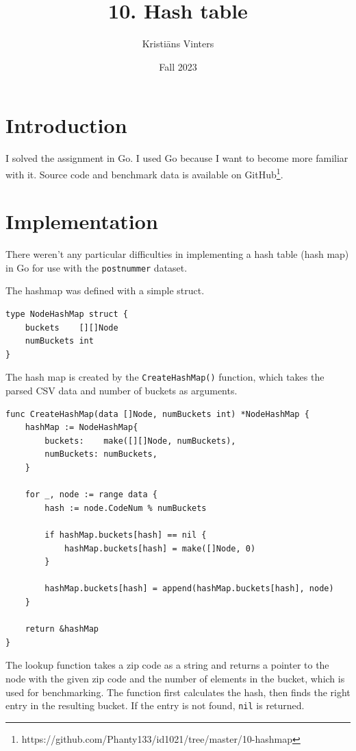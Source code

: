 \documentclass[a4paper,11pt]{article}
\title{\textbf{10. Hash table}}
\author{Kristiāns Vinters}
\date{Fall 2023}
\begin{document}
    \maketitle
    \section*{Introduction}

    I solved the assignment in Go. I used Go because I want to become more familiar with it. Source code and benchmark data is available on GitHub\footnote{https://github.com/Phanty133/id1021/tree/master/10-hashmap}.

    \section*{Implementation}

    There weren't any particular difficulties in implementing a hash table (hash map) in Go for use with the \texttt{postnummer} dataset.

    The hashmap was defined with a simple struct.

    \begin{verbatim}
type NodeHashMap struct {
    buckets    [][]Node
    numBuckets int
}
    \end{verbatim}

    The hash map is created by the \texttt{CreateHashMap()} function, which takes the parsed CSV data and number of buckets as arguments.

    \begin{verbatim}
func CreateHashMap(data []Node, numBuckets int) *NodeHashMap {
    hashMap := NodeHashMap{
        buckets:    make([][]Node, numBuckets),
        numBuckets: numBuckets,
    }

    for _, node := range data {
        hash := node.CodeNum % numBuckets

        if hashMap.buckets[hash] == nil {
            hashMap.buckets[hash] = make([]Node, 0)
        }

        hashMap.buckets[hash] = append(hashMap.buckets[hash], node)
    }

    return &hashMap
}
    \end{verbatim}

    The lookup function takes a zip code as a string and returns a pointer to the node with the given zip code and the number of elements in the bucket, which is used for benchmarking. The function first calculates the hash, then finds the right entry in the resulting bucket. If the entry is not found, \texttt{nil} is returned.
\end{document}
